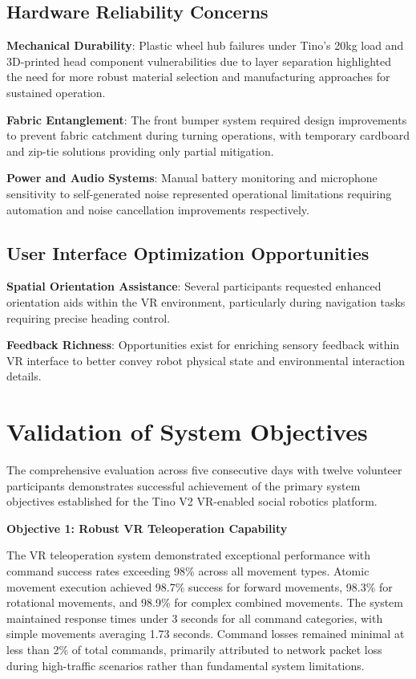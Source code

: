 \subsection{Hardware Reliability Concerns}

\textbf{Mechanical Durability}: Plastic wheel hub failures under Tino's 20kg load and 3D-printed head component vulnerabilities due to layer separation highlighted the need for more robust material selection and manufacturing approaches for sustained operation.

\textbf{Fabric Entanglement}: The front bumper system required design improvements to prevent fabric catchment during turning operations, with temporary cardboard and zip-tie solutions providing only partial mitigation.

\textbf{Power and Audio Systems}: Manual battery monitoring and microphone sensitivity to self-generated noise represented operational limitations requiring automation and noise cancellation improvements respectively.

\subsection{User Interface Optimization Opportunities}

\textbf{Spatial Orientation Assistance}: Several participants requested enhanced orientation aids within the VR environment, particularly during navigation tasks requiring precise heading control.

\textbf{Feedback Richness}: Opportunities exist for enriching sensory feedback within VR interface to better convey robot physical state and environmental interaction details.

\section{Validation of System Objectives}
\label{sec:objective_validation}

The comprehensive evaluation across five consecutive days with twelve volunteer participants demonstrates successful achievement of the primary system objectives established for the Tino V2 VR-enabled social robotics platform.

\textbf{Objective 1: Robust VR Teleoperation Capability}

The VR teleoperation system demonstrated exceptional performance with command success rates exceeding 98\% across all movement types. Atomic movement execution achieved 98.7\% success for forward movements, 98.3\% for rotational movements, and 98.9\% for complex combined movements. The system maintained response times under 3 seconds for all command categories, with simple movements averaging 1.73 seconds. Command losses remained minimal at less than 2\% of total commands, primarily attributed to network packet loss during high-traffic scenarios rather than fundamental system limitations.

